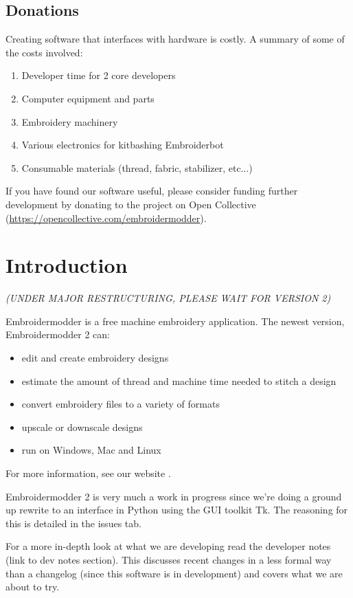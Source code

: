 \documentclass{report}
\begin{document}
\section{Donations}

Creating software that interfaces with hardware is costly. A summary of some of the costs involved:

\begin{enumerate}
\item Developer time for 2 core developers
\item Computer equipment and parts
\item Embroidery machinery
\item Various electronics for kitbashing Embroiderbot
\item Consumable materials (thread, fabric, stabilizer, etc...)
\end{enumerate}

If you have found our software useful, please consider funding further development by donating to the project on Open Collective (\url{https://opencollective.com/embroidermodder}).

\chapter{Introduction}

\emph{(UNDER MAJOR RESTRUCTURING, PLEASE WAIT FOR VERSION 2)}

Embroidermodder is a free machine embroidery application.
The newest version, Embroidermodder 2 can:

\begin{itemize}
\item edit and create embroidery designs
\item estimate the amount of thread and machine time needed to stitch a design
\item convert embroidery files to a variety of formats
\item upscale or downscale designs
\item run on Windows, Mac and Linux
\end{itemize}

For more information, see our website \cite{thewebsite}.

Embroidermodder 2 is very much a work in progress since we're doing a ground up rewrite to an interface in Python using the GUI toolkit Tk. The reasoning for this is detailed in the issues tab.

For a more in-depth look at what we are developing read the developer notes (link to dev notes section). This discusses recent changes in a less formal way than a changelog (since this software is in development) and covers what we are about to try.
\end{document}
